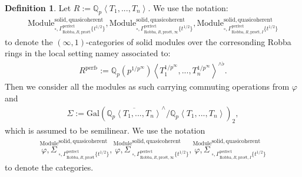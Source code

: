 \documentclass[12pt]{book}
\theoremstyle{definition}
\newtheorem{definition}{Definition}
\begin{document}
\begin{definition}
Let $R:=\mathbb{Q}_p\left<T_1,...,T_n\right>$. We use the notation:
\begin{align}
\mathrm{Module}^\mathrm{solid,quasicoherent}_{\square,\Gamma^\mathrm{perfect}_{\text{Robba},R,\text{pro\'et}}\{t^{1/2}\}},\mathrm{Module}^\mathrm{solid,quasicoherent}_{\square,\Gamma^\mathrm{perfect}_{\text{Robba},R,\text{pro\'et},\infty}\{t^{1/2}\}},
\mathrm{Module}^\mathrm{solid,quasicoherent}_{\square,\Gamma^\mathrm{perfect}_{\text{Robba},R,\text{pro\'et},I}\{t^{1/2}\}} 
\end{align}
to denote the $(\infty,1)$-categories of solid modules over the corresonding Robba rings in the local setting namey associated to:
\begin{align}
R^\mathrm{perf\flat}:=\mathbb{Q}_p(p^{1/p^\infty})\left<T^{1/p^\infty}_1,...,T^{1/p^\infty}_n\right>^{\wedge\flat}.
\end{align}
Then we consider all the modules as such carrying commuting operations from $\varphi$ and 
\begin{align}
\Sigma:=\mathrm{Gal}(\overline{\mathbb{Q}_p\left<T_1,...,T_n\right>}^\wedge/\mathbb{Q}_p\left<T_1,...,T_n\right>)_2,
\end{align}
which is assumed to be semilinear. We use the notation 
\begin{align}
\overset{\mathrm{Module}}{\varphi,\Sigma}^\mathrm{solid,quasicoherent}_{\square,\Gamma^\mathrm{perfect}_{\text{Robba},R,\text{pro\'et}}\{t^{1/2}\}},\overset{\mathrm{Module}}{\varphi,\Sigma}^\mathrm{solid,quasicoherent}_{\square,\Gamma^\mathrm{perfect}_{\text{Robba},R,\text{pro\'et},\infty}\{t^{1/2}\}},
\overset{\mathrm{Module}}{\varphi,\Sigma}^\mathrm{solid,quasicoherent}_{\square,\Gamma^\mathrm{perfect}_{\text{Robba},R,\text{pro\'et},I}\{t^{1/2}\}} 
\end{align}
to denote the categories.
\end{definition}
\end{document}
